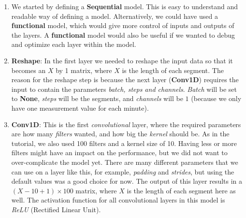 \begin{enumerate}
      \item We started by defining a \textbf{Sequential} model. This is easy to understand and readable way of defining a model. Alternatively, we could have used a \textbf{functional} model, which would give more control of inputs and outputs of the layers. A \textbf{functional} model would also be useful if we wanted to debug and optimize each layer within the model. 
      
      \item \textbf{Reshape}: In the first layer we needed to reshape the input data so that it becomes an $X$ by 1 matrix, where $X$ is the length of each segment. The reason for the reshape step is because the next layer (\textbf{Conv1D}) requires the input to contain the parameters \textit{batch, steps and channels}. \textit{Batch} will be set to \textbf{None}, \textit{steps} will be the segments, and \textit{channels} will be $1$ (because we only have one measurement value for each minute).
      
      \item \textbf{Conv1D}: This is the first \textit{convolutional} layer, where the required parameters are how many \textit{filters} wanted, and how big the \textit{kernel} should be. As in the tutorial, we also used 100 filters and a kernel size of 10. Having less or more filters might have an impact on the performance, but we did not want to over-complicate the model yet. There are many different parameters that we can use on a layer like this, for example, \textit{padding} and \textit{strides}, but using the default values was a good choice for now. The output of this layer results in a $(X-10+1) \times 100$ matrix, where $X$ is the length of each segment here as well. The activation function for all convolutional layers in this model is \textit{ReLU} (Rectified Linear Unit). 


\end{enumerate}
